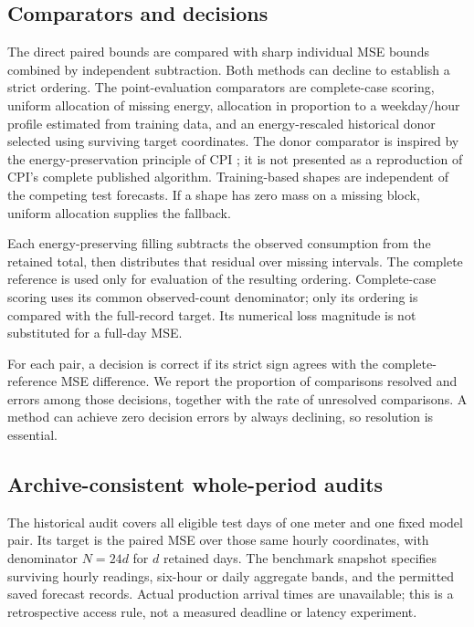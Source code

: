 \subsection{Comparators and decisions}
The direct paired bounds are compared with sharp individual MSE bounds
combined by independent subtraction. Both methods can decline to establish
a strict ordering. The point-evaluation comparators are complete-case
scoring, uniform allocation of missing energy, allocation in proportion to
a weekday/hour profile estimated from training data, and an energy-rescaled
historical donor selected using surviving target coordinates. The donor
comparator is inspired by the energy-preservation principle of CPI
\citep{cpi}; it is not presented as a reproduction of CPI's complete
published algorithm. Training-based shapes are independent of the competing
test forecasts. If a shape has zero mass on a missing block, uniform
allocation supplies the fallback.

Each energy-preserving filling subtracts the observed consumption from
the retained total, then distributes that residual over missing intervals.
The complete reference is used only for evaluation of the resulting
ordering. Complete-case scoring uses its common observed-count
denominator; only its ordering is compared with the full-record target.
Its numerical loss magnitude is not substituted for a full-day MSE.

For each pair, a decision is correct if its strict sign agrees with the
complete-reference MSE difference. We report the proportion of comparisons
resolved and errors among those decisions, together with the rate of
unresolved comparisons. A method can achieve zero decision errors by
always declining, so resolution is essential. 

\subsection{Archive-consistent whole-period audits}\label{sec:period-information}
The historical audit covers all eligible test days of one meter and one
fixed model pair. Its target is the paired MSE over those same hourly
coordinates, with denominator $N=24d$ for $d$ retained days. The benchmark
snapshot specifies surviving hourly readings, six-hour or daily aggregate
bands, and the permitted saved forecast records. Actual production arrival
times are unavailable; this is a retrospective access rule, not a measured
deadline or latency experiment.

